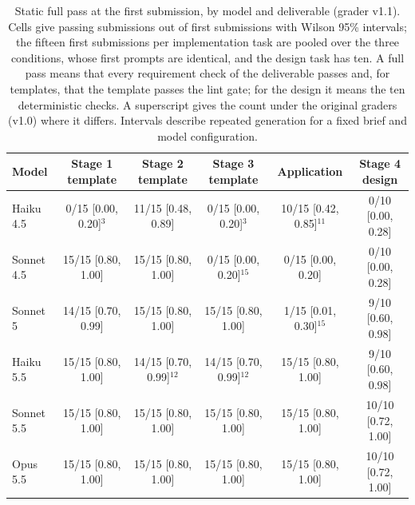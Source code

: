 \begin{table}[t]
\caption{Static full pass at the first submission, by model and deliverable (grader v1.1). Cells give passing submissions out of first submissions with Wilson 95\% intervals; the fifteen first submissions per implementation task are pooled over the three conditions, whose first prompts are identical, and the design task has ten. A full pass means that every requirement check of the deliverable passes and, for templates, that the template passes the lint gate; for the design it means the ten deterministic checks. A superscript gives the count under the original graders (v1.0) where it differs. Intervals describe repeated generation for a fixed brief and model configuration.}
\label{tab:primary}
\footnotesize
\setlength{\tabcolsep}{3.5pt}
\begin{tabular}{lccccc}
\toprule
Model & Stage 1 template & Stage 2 template & Stage 3 template & Application & Stage 4 design\\
\midrule
Haiku 4.5 & 0/15 {\scriptsize[0.00, 0.20]}$^{3}$ & 11/15 {\scriptsize[0.48, 0.89]} & 0/15 {\scriptsize[0.00, 0.20]}$^{3}$ & 10/15 {\scriptsize[0.42, 0.85]}$^{11}$ & 0/10 {\scriptsize[0.00, 0.28]}\\
Sonnet 4.5 & 15/15 {\scriptsize[0.80, 1.00]} & 15/15 {\scriptsize[0.80, 1.00]} & 0/15 {\scriptsize[0.00, 0.20]}$^{15}$ & 0/15 {\scriptsize[0.00, 0.20]} & 0/10 {\scriptsize[0.00, 0.28]}\\
Sonnet 5 & 14/15 {\scriptsize[0.70, 0.99]} & 15/15 {\scriptsize[0.80, 1.00]} & 15/15 {\scriptsize[0.80, 1.00]} & 1/15 {\scriptsize[0.01, 0.30]}$^{15}$ & 9/10 {\scriptsize[0.60, 0.98]}\\
Haiku 5.5 & 15/15 {\scriptsize[0.80, 1.00]} & 14/15 {\scriptsize[0.70, 0.99]}$^{12}$ & 14/15 {\scriptsize[0.70, 0.99]}$^{12}$ & 15/15 {\scriptsize[0.80, 1.00]} & 9/10 {\scriptsize[0.60, 0.98]}\\
Sonnet 5.5 & 15/15 {\scriptsize[0.80, 1.00]} & 15/15 {\scriptsize[0.80, 1.00]} & 15/15 {\scriptsize[0.80, 1.00]} & 15/15 {\scriptsize[0.80, 1.00]} & 10/10 {\scriptsize[0.72, 1.00]}\\
Opus 5.5 & 15/15 {\scriptsize[0.80, 1.00]} & 15/15 {\scriptsize[0.80, 1.00]} & 15/15 {\scriptsize[0.80, 1.00]} & 15/15 {\scriptsize[0.80, 1.00]} & 10/10 {\scriptsize[0.72, 1.00]}\\
\bottomrule
\end{tabular}
\end{table}
